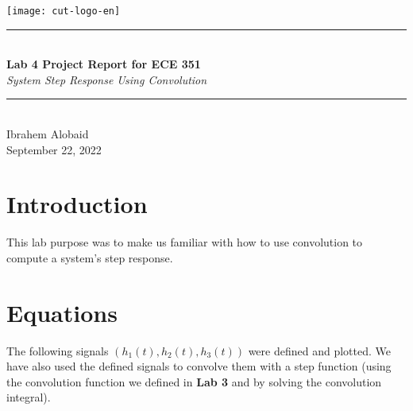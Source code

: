 \documentclass[12pt,a4paper]{article}
\newcommand{\HRule}{\rule{\linewidth}{0.5mm}}
\begin{document}
\begin{titlepage}
\begin{center}
\texttt{[image: cut-logo-en]}~\\[2cm]
\HRule \\[0.4cm]
{ \LARGE 
  \textbf{Lab 4 Project Report for ECE 351}\\[0.4cm]
  \emph{System Step Response Using Convolution}\\[0.4cm]
}
\HRule \\[1.5cm]
{ \large
  Ibrahem Alobaid \\[0.1cm]
  September 22, 2022\\[0.1cm]
}
\vfill

\end{center}
\end{titlepage}
\newpage
\tableofcontents
{}
\newpage
\setcounter{page}{1}
\section{Introduction}\label{sec:intro}
    This lab purpose was to make us familiar with how to use convolution to compute a system's step response.

\section{Equations}\label{sec:lit-rev}
    The following signals $(h_1(t), h_2(t), h_3(t))$ were defined and plotted. We have also used the defined signals to convolve them with a step function (using the convolution function we defined in \textbf{Lab 3} and by solving the convolution integral).
\end{document}
